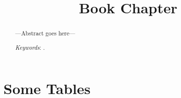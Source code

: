 \documentclass[11pt, english]{article}
\title{Book Chapter}
\begin{document}
\begin{singlespace}
  
\maketitle

\begin{abstract}

---Abstract goes here---

\bigskip

\textit{Keywords}: .

\end{abstract}

\end{singlespace}

\clearpage


\section{Some Tables}
\end{document}
